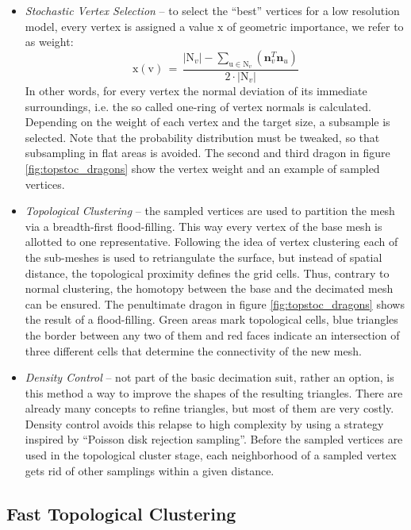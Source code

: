\begin{itemize}
	\item \textit{Stochastic Vertex Selection} -- to select the ``best'' vertices for a low resolution model, every vertex is assigned a value $\mathrm{x}$ of geometric importance, we refer to as weight: \begin{equation} \label{eq:vertex_weight}
\mathrm{x}(\mathrm{v}) \,=\, \frac{|\mathrm{N}_{v}| - \sum_{\mathrm{u} \in \mathrm{N}_{v} } (\textbf{n}^{T}_{v}\textbf{n}_{u})}{2 \cdot |\mathrm{N}_{v}|}
\end{equation}
In other words, for every vertex the normal deviation of its immediate surroundings, i.e. the so called one-ring of vertex normals is calculated. Depending on the weight of each vertex and the target size, a subsample is selected. Note that the probability distribution must be tweaked, so that subsampling in flat areas is avoided. The second and third dragon in figure \ref{fig:topstoc_dragons} show the vertex weight and an example of sampled vertices.
	\item \textit{Topological Clustering} -- the sampled vertices are used to partition the mesh via a breadth-first flood-filling. This way every vertex of the base mesh is allotted to one representative. Following the idea of vertex clustering each of the sub-meshes is used to retriangulate the surface, but instead of spatial distance, the topological proximity defines the grid cells. Thus, contrary to normal clustering, the homotopy between the base and the decimated mesh can be ensured. The penultimate dragon in figure \ref{fig:topstoc_dragons} shows the result of a flood-filling. Green areas mark topological cells, blue triangles the border between any two of them and red faces indicate an intersection of three different cells that determine the connectivity of the new mesh.
	\item \textit{Density Control} -- not part of the basic decimation suit, rather an option, is this method a way to improve the shapes of the resulting triangles. There are already many concepts to refine triangles, but most of them are very costly. Density control avoids this relapse to high complexity by using a strategy inspired by ``Poisson disk rejection sampling''. Before the sampled vertices are used in the topological cluster stage, each neighborhood of a sampled vertex gets rid of other samplings within a given distance. 
\end{itemize}


\subsection{Fast Topological Clustering}
\label{topstoc121}

